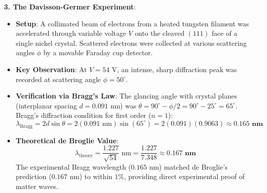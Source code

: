 \begin{theorysol}
\textbf{3. The Davisson-Germer Experiment}:
\begin{itemize}
    \item \textbf{Setup}: A collimated beam of electrons from a heated tungsten filament was accelerated through variable voltage $V$ onto the cleaved $(111)$ face of a single nickel crystal. Scattered electrons were collected at various scattering angles $\phi$ by a movable Faraday cup detector.
    \item \textbf{Key Observation}: At $V = 54\text{ V}$, an intense, sharp diffraction peak was recorded at scattering angle $\phi = 50^\circ$.
    \item \textbf{Verification via Bragg's Law}:
    The glancing angle with crystal planes (interplanar spacing $d = 0.091\text{ nm}$) was $\theta = 90^\circ - \phi/2 = 90^\circ - 25^\circ = 65^\circ$.
    Bragg's diffraction condition for first order ($n=1$):
    \begin{equation}
    \lambda_{\text{Bragg}} = 2 d \sin\theta = 2(0.091\text{ nm})\sin(65^\circ) = 2(0.091)(0.9063) \approx \mathbf{0.165\text{ nm}}
    \end{equation}
    \item \textbf{Theoretical de Broglie Value}:
    \begin{equation}
    \lambda_{\text{theory}} = \frac{1.227}{\sqrt{54}}\text{ nm} = \frac{1.227}{7.348} \approx \mathbf{0.167\text{ nm}}
    \end{equation}
    The experimental Bragg wavelength ($0.165\text{ nm}$) matched de Broglie's prediction ($0.167\text{ nm}$) to within $1\%$, providing direct experimental proof of matter waves.
\end{itemize}
\end{theorysol}
\vspace{4mm}

